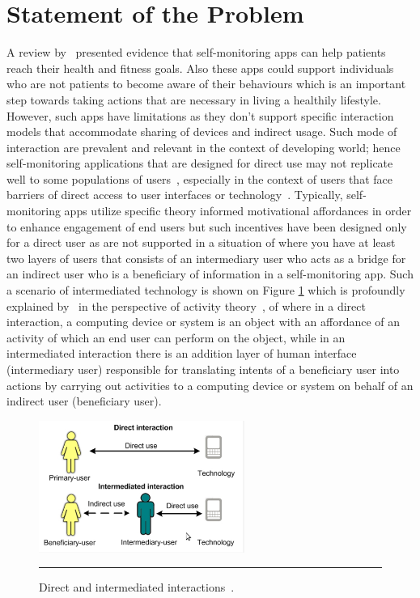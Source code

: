 \section{Statement of the Problem}
A review by~\cite{higgins2016smartphone} presented evidence that self-monitoring apps can help patients reach their health and fitness goals. Also these apps could support individuals who are not patients to become aware of their behaviours which is an important step towards taking actions that are necessary in living a healthily lifestyle. However, such apps have limitations as they don't support specific interaction models that accommodate sharing of devices and indirect usage. Such mode of interaction are prevalent and relevant in the context of developing world; hence self-monitoring applications that are designed for direct use may not replicate well to some populations of users~\citep{kaplan2006can,sambasivan2010}, especially in the context of users that face barriers of direct access to user interfaces or technology~\citep{kumar2015mobile}. Typically, self-monitoring apps utilize  specific theory informed motivational affordances in order to enhance engagement of end users but such incentives have been designed only for a direct user as are not supported in a situation of where you have at least two layers of users that consists of an intermediary user who acts as a bridge for an indirect user who is a beneficiary of information in a self-monitoring app. Such a scenario of intermediated technology is shown on Figure \ref{figure:directVSinterm}  which is profoundly explained by~\cite{sambasivan2010} in the perspective of activity theory~\citep{kaptelinin1997activity}, of where in a direct interaction, a computing device or system is an object with an affordance of an activity of which an end user can perform on the object, while in an intermediated interaction there is an addition layer of human interface (intermediary user) responsible for translating intents of a beneficiary user into actions by carrying out activities to a computing device or system on behalf of an indirect user (beneficiary user).
\begin{figure}[htbp]
  \centering
    \includegraphics[width=0.6\textwidth]{Figures/intermediated.png}
    \rule{35em}{0.5pt}
  \caption{Direct and intermediated interactions~\citep{sambasivan2010}.}
  \label{figure:directVSinterm}
\end{figure}

